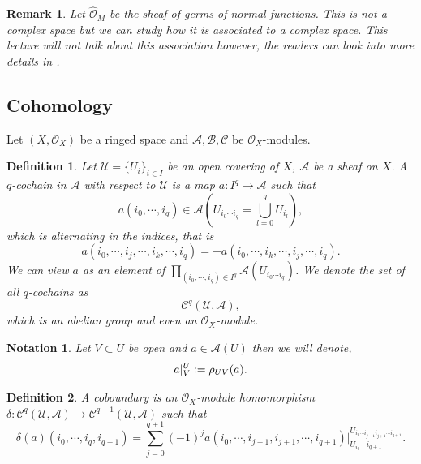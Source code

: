 \documentclass{article}
\newtheorem{definition}{Definition}[section]
\newtheorem{notation}{Notation}[section]
\newtheorem{remark}{Remark}[section]
\newcommand{\defeq}{\vcentcolon=}
\newcommand{\cA}[0]{\mathcal{A}}
\newcommand{\cB}[0]{\mathcal{B}}
\newcommand{\cC}[0]{\mathcal{C}}
\newcommand{\Ouv}[0]{\mathcal{O}}
\begin{document}
\begin{remark}
  Let $\hat{\Ouv}_M$ be the sheaf of germs of normal functions. This is not a complex space but we can study how it is associated to a complex space. This lecture will not talk about this association however, the readers can look into more details in \cite{Gr-Fr}.
\end{remark}

\subsection{Cohomology}
Let $(X,\Ouv_X)$ be a ringed space and $\cA,\cB,\cC$ be $\Ouv_X$-modules.
\begin{definition}
  Let $\mathscr{U}=\{U_i\}_{i\in I}$ be an open covering of $X$, $\cA$ be a sheaf on $X$. A $q$-cochain in $\cA$ with respect to $\mathscr{U}$ is a map $a:I^q\to \cA$ such that 
  \begin{equation*}
    a(i_0,\cdots,i_q)\in\cA\left(U_{i_0\cdots i_q}=\bigcup_{l=0}^qU_{i_l}\right),
  \end{equation*}
  which is alternating in the indices, that is 
  \begin{equation*}
    a(i_0,\cdots,i_j,\cdots,i_k,\cdots,i_q) = - a(i_0,\cdots,i_k,\cdots,i_j,\cdots,i_q).
  \end{equation*}
  We can view $a$ as an element of $\prod_{(i_0,\cdots,i_q)\in I^q}\cA(U_{i_0\cdots i_q})$. We denote the set of all $q$-cochains as 
  \begin{equation*}
    \cC^q(\mathscr{U},\cA),
  \end{equation*}
  which is an abelian group and even an $\Ouv_X$-module.
\end{definition}

\begin{notation}
  Let $V\subset U$ be open and $a\in\cA(U)$ then we will denote,
  \begin{equation*}
    a|_V^U \defeq \rho_{UV}(a).
  \end{equation*}
\end{notation}

\begin{definition}
  A coboundary is an $\Ouv_X$-module homomorphism $\delta:\cC^q(\mathscr{U},\cA)\to \cC^{q+1}(\mathscr{U},\cA)$ such that 
  \begin{equation*}
    \delta(a)(i_0,\cdots,i_q,i_{q+1}) = \sum_{j=0}^{q+1}(-1)^ja(i_0,\cdots,i_{j-1},i_{j+1},\cdots,i_{q+1})|^{U_{i_0\cdots i_{j-1}i_{j+1}\cdots i_{q+1}}}_{U_{i_0}\cdots i_{q+1}}.
  \end{equation*}
\end{definition}
\end{document}
